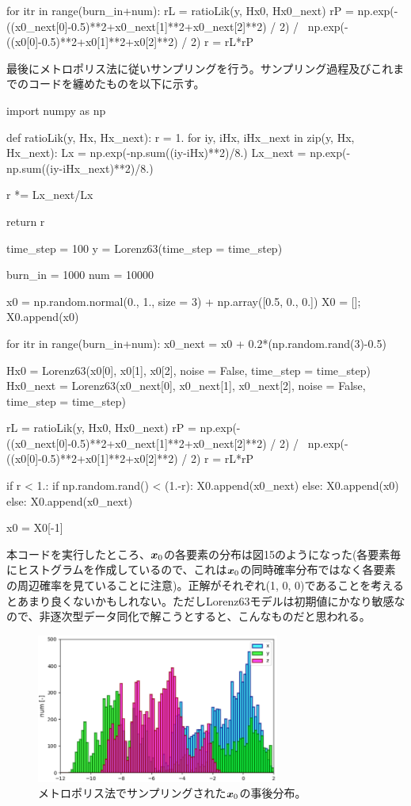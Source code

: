 \documentclass[dvipdfmx, 9pt, a4paper]{jsarticle}
\newcommand{\bm}[1]{{\mbox{\boldmath $#1$}}}
\begin{document}
\begin{python}
for itr in range(burn_in+num):
	rL = ratioLik(y, Hx0, Hx0_next)
	rP = np.exp(-((x0_next[0]-0.5)**2+x0_next[1]**2+x0_next[2]**2) / 2) / \
		np.exp(-((x0[0]-0.5)**2+x0[1]**2+x0[2]**2) / 2)
	r = rL*rP
\end{python}\bigskip
最後にメトロポリス法に従いサンプリングを行う。サンプリング過程及びこれまでのコードを纏めたものを以下に示す。\bigskip
\begin{python}
import numpy as np

def ratioLik(y, Hx, Hx_next):
	r = 1.
	for iy, iHx, iHx_next in zip(y, Hx, Hx_next):
		Lx = np.exp(-np.sum((iy-iHx)**2)/8.)
		Lx_next = np.exp(-np.sum((iy-iHx_next)**2)/8.)

		r *= Lx_next/Lx

	return r

time_step = 100
y = Lorenz63(time_step = time_step)

burn_in = 1000
num = 10000

x0 = np.random.normal(0., 1., size = 3) + np.array([0.5, 0., 0.])
X0 = []; X0.append(x0)

for itr in range(burn_in+num):
	x0_next = x0 + 0.2*(np.random.rand(3)-0.5)

	Hx0 = Lorenz63(x0[0], x0[1], x0[2], noise = False, time_step = time_step)
	Hx0_next = Lorenz63(x0_next[0], 
				x0_next[1], x0_next[2], noise = False, time_step = time_step)

	rL = ratioLik(y, Hx0, Hx0_next)
	rP = np.exp(-((x0_next[0]-0.5)**2+x0_next[1]**2+x0_next[2]**2) / 2) / \
		np.exp(-((x0[0]-0.5)**2+x0[1]**2+x0[2]**2) / 2)
	r = rL*rP

	if r < 1.:
		if np.random.rand() < (1.-r):
			X0.append(x0_next)
		else:
			X0.append(x0)
	else:
		X0.append(x0_next)

	x0 = X0[-1]
\end{python}\bigskip
本コードを実行したところ、$\bm x_0$の各要素の分布は図15のようになった(各要素毎にヒストグラムを作成しているので、これは$\bm x_0$の同時確率分布ではなく各要素の周辺確率を見ていることに注意)。正解がそれぞれ(1, 0, 0)であることを考えるとあまり良くないかもしれない。ただしLorenz63モデルは初期値にかなり敏感なので、非逐次型データ同化で解こうとすると、こんなものだと思われる。

\begin{figure}[t]
\begin{center}
\includegraphics[width=8cm]{"fig15.png"}
\caption{メトロポリス法でサンプリングされた$\bm x_0$の事後分布。}
\end{center}
\end{figure}
\end{document}
